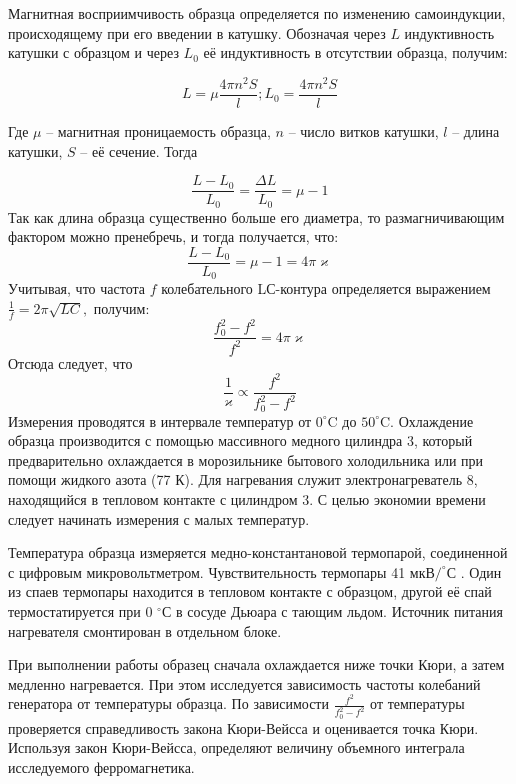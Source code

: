 \documentclass[a4paper, 12pt]{article}%
\begin{document}
Магнитная восприимчивость образца определяется по изменению самоиндукции, происходящему при его введении в катушку. Обозначая через $L$ индуктивность катушки с образцом и через $L_0$ её индуктивность в отсутствии образца, получим:

$$
L=\mu \frac{4 \pi n^{2} S}{l} ; L_{0}=\frac{4 \pi n^{2} S}{l}
$$

Где $\mu$ -- магнитная проницаемость образца, $n$ -- число витков катушки, $l$ -- длина катушки, $S$ -- её сечение. Тогда

$$
\frac{L-L_{0}}{L_{0}}=\frac{\Delta L}{L_{0}}=\mu-1
$$
Так как длина образца существенно больше его диаметра, то размагничивающим
фактором можно пренебречь, и тогда получается, что:
$$
\frac{L-L_{0}}{L_{0}}=\mu-1=4 \pi \varkappa
$$
Учитывая, что частота $f$ колебательного LС-контура определяется выражением $\frac{1}{f}=2 \pi \sqrt{L C},$
получим:
$$
\frac{f_{0}^{2}-f^{2}}{f^{2}}=4 \pi \varkappa
$$
Отсюда следует, что
$$
\frac{1}{\varkappa} \propto \frac{f^{2}}{f_{0}^{2}-f^{2}}
$$
Измерения проводятся в интервале температур от $0^{\circ} \mathrm{ C}$ до $50^{\circ} \mathrm{ C} .$ Охлаждение образца производится с помощью массивного медного цилиндра 3, который предварительно охлаждается в морозильнике бытового холодильника или при помощи жидкого азота (77 К). Для нагревания служит электронагреватель 8, находящийся в тепловом контакте с
цилиндром 3. С целью экономии времени следует начинать измерения с малых
температур.

Температура образца измеряется медно-константановой термопарой, соединенной с цифровым микровольтметром. Чувствительность термопары 41 $\text{мкВ}/^\circ \text{С}$ . Один из спаев термопары находится в тепловом контакте с образцом, другой её спай термостатируется при 0 $  ^\circ \text{С}$ в сосуде Дьюара с тающим льдом. Источник питания нагревателя смонтирован в отдельном блоке. 

При выполнении работы образец сначала охлаждается ниже точки Кюри, а затем медленно нагревается. При этом исследуется зависимость частоты колебаний генератора от температуры образца. По зависимости $\frac{f^2}{f_0^2-f^2}$ от температуры проверяется справедливость закона Кюри-Вейсса и оценивается точка Кюри. Используя закон Кюри-Вейсса, определяют величину объемного интеграла исследуемого ферромагнетика. 
\newpage
\end{document}
